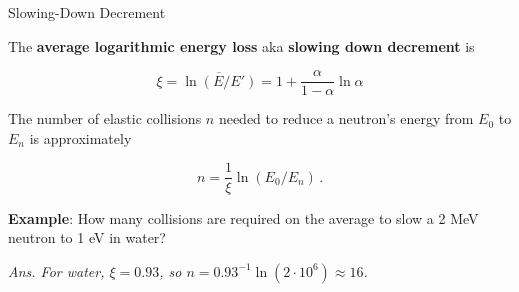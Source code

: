 \documentclass[aspectratio=1610]{beamer}
\let\oldfootnotesize\footnotesize
\renewcommand*{\footnotesize}{\oldfootnotesize\tiny}
\begin{document}
\begin{frame}[fragile]{Slowing-Down Decrement}

The {\bf average logarithmic energy loss} aka {\bf slowing down
decrement} is

\[
  \xi = \overline{\ln(E/E')} 
    = 1 + \frac{\alpha}{1-\alpha}\ln\alpha 
  \tag{FNRP 2.54 and 2.56}
\]

The number of elastic collisions \(n\) needed to reduce a neutron's
energy from \(E_0\) to \(E_n\) is approximately

\[
  n = \frac{1}{\xi} \ln(E_0/E_n) \, .
  \tag{FNRP 2.59}
\]


\pause 


{\bf Example}:  How many collisions are required on the average to 
slow a 2 MeV neutron to 1 eV in water?

\pause 
 
{\it\footnotesize Ans. For water, $\xi = 0.93$, so $n = 0.93^{-1}\ln(2\cdot 10^6)\approx 16$.} 

\end{frame}
 
\end{document}
